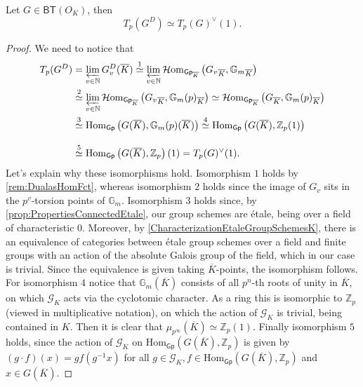 \begin{prop}[]
	Let $G \in \mathsf{BT}(O_K)$, then
	\begin{equation*}
		T_p(G^D) \simeq T_p(G)^\vee(1)
	.\end{equation*}
\end{prop}
\begin{proof}
	We need to notice that
	\begin{align*}
		T_p(G^D) &= \varprojlim_{v \in \mathbb{N}} G_v^D(\overline{K})
		\stackrel{1}{\simeq} \varprojlim_{v \in \mathbb{N}}
		\mathcal{H}\mathrm{om}_{ \mathsf{Gp}_{\overline{K}} }
		\left( {G_v}_{\overline{K}}, {\mathbb{G}_m}_{\overline{K}} \right) \\
		&\stackrel{2}{\simeq} \varprojlim_{v \in \mathbb{N}}
		\mathcal{H}\mathrm{om}_{ \mathsf{Gp}_{\overline{K}} }
		\left( {G_v}_{\overline{K}}, {\mathbb{G}_m(p)}_{\overline{K}}\right)
		\simeq \mathcal{H}\mathrm{om}_{ \mathsf{Gp}_{\overline{K}} }
		\left( {G}_{\overline{K}}, {\mathbb{G}_m(p)}_{\overline{K}} \right)\\
		&\stackrel{3}{\simeq} \mathrm{Hom}_{ \mathsf{Gp} } 
		\left( G(\overline{K}), \mathbb{G}_m(p)(\overline{K}) \right)
		\stackrel{4}{\simeq} \mathrm{Hom}_{ \mathsf{Gp} } 
		\left( G(\overline{K}), \mathbb{Z}_{p}(1) \right) 
		\phantom{\varprojlim_{v \in \mathbb{N}}}\\
		&\stackrel{5}{\simeq} \mathrm{Hom}_{ \mathsf{Gp} } 
		\left( G(\overline{K}), \mathbb{Z}_{p} \right)(1)
		= T_p(G)^\vee(1)
	.\end{align*}
	Let's explain why these isomorphisms hold.
	Isomorphism $1$ holds by \cref{rem:DualasHomFct}, whereas isomorphism $2$
	holds since the image of $G_v$ sits in the $p^v$-torsion points of $\mathbb{G}_m$.
	Isomorphism $3$ holds since, by \cref{prop:PropertiesConnectedEtale}, our group
	schemes are étale, being over a field of characteristic $0$.
	Moreover, by \cref{CharacterizationEtaleGroupSchemesK}, there is an equivalence of categories
	between étale group schemes over a field and finite groups with an action
	of the absolute Galois group of the field, which in our case is trivial.
	Since the equivalence is given taking $\overline{K}$-points, the isomorphism follows.
	For isomorphism $4$ notice that $\mathbb{G}_m(\overline{K})$ consists of all
	$p^n$-th roots of unity in $\overline{K}$, on which $\mathscr{G}_K$ acts via the cyclotomic character.
	As a ring this is isomorphic to $\mathbb{Z}_{p}$ (viewed in multiplicative notation),
	on which the action of $\mathscr{G}_K$ is trivial, being contained in $K$.
	Then it is clear that $\mu_{p^\infty}(\overline{K}) \simeq \mathbb{Z}_{p}(1)$.
	Finally isomorphism $5$ holds, since the action of $\mathscr{G}_K$ on 
	$\mathrm{Hom}_{ \mathsf{Gp} } \left( G(\overline{K}), \mathbb{Z}_{p} \right)$
	is given by $(g \cdot f)(x) = gf(g^{-1}x)$ for all $g \in \mathscr{G}_K, 
	f \in \mathrm{Hom}_{\mathsf{Gp}} \left( G(\overline{K}), \mathbb{Z}_{p} \right)$
	and $x \in G(\overline{K})$.
\end{proof}
